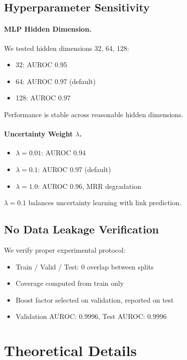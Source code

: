 \subsection{Hyperparameter Sensitivity}

\paragraph{MLP Hidden Dimension.}
We tested hidden dimensions 32, 64, 128:
\begin{itemize}
    \item 32: AUROC 0.95
    \item 64: AUROC 0.97 (default)
    \item 128: AUROC 0.97
\end{itemize}

Performance is stable across reasonable hidden dimensions.

\paragraph{Uncertainty Weight $\lambda$.}
\begin{itemize}
    \item $\lambda = 0.01$: AUROC 0.94
    \item $\lambda = 0.1$: AUROC 0.97 (default)
    \item $\lambda = 1.0$: AUROC 0.96, MRR degradation
\end{itemize}

$\lambda = 0.1$ balances uncertainty learning with link prediction.

\subsection{No Data Leakage Verification}

We verify proper experimental protocol:
\begin{itemize}
    \item Train / Valid / Test: 0 overlap between splits
    \item Coverage computed from train only
    \item Boost factor selected on validation, reported on test
    \item Validation AUROC: 0.9996, Test AUROC: 0.9996
\end{itemize}

\section{Theoretical Details}
\label{app:theory}

